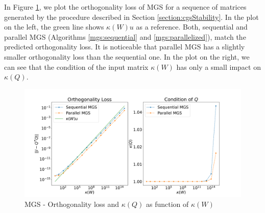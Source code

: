 \documentclass{article}
\begin{document}
In Figure \ref{fig:orthoErrorMGS}, we plot the orthogonality loss of MGS for a
sequence of matrices generated by the procedure described in Section
\ref{section:cgsStability}. In the plot on the left, the green line shows
$\kappa(W) u$ as a reference. Both, sequential and parallel MGS (Algorithms
\ref{mgs:sequential} and \ref{mgs:parallelized}), match the predicted
orthogonality loss. It is noticeable that parallel MGS has a slightly smaller
orthogonality loss than the sequential one. In the plot on the right, we can see
that the condition of the input matrix $\kappa(W)$ has only a small impact on
$\kappa(Q)$.
\begin{figure}[t]
    \centering %
    \caption{MGS - Orthogonality loss and $\kappa(Q)$ as function of $\kappa(W)$} \label{fig:orthoErrorMGS}
    \includegraphics[width=\textwidth, trim = 0cm 1cm 0cm 1cm]{./plots/MGS_Orthogonality_Error_complete.pdf}
\end{figure}
\end{document}
